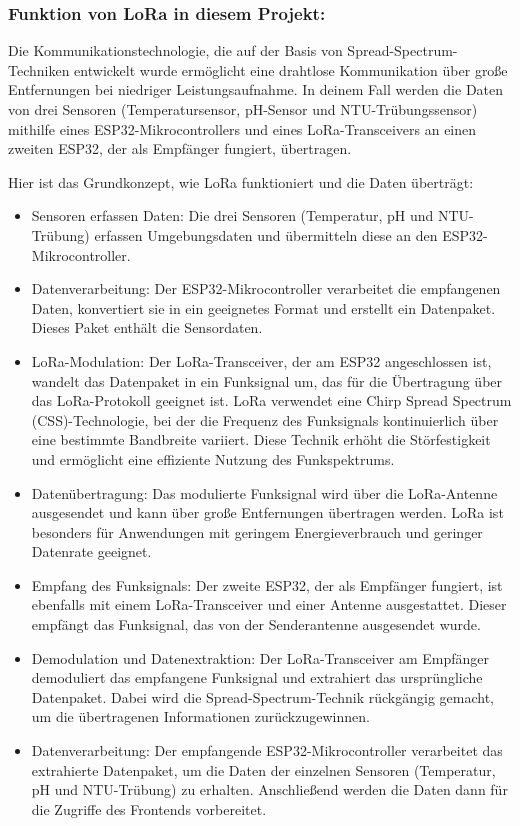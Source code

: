 \subsubsection*{Funktion von LoRa in diesem Projekt:}

Die Kommunikationstechnologie, die auf der Basis von Spread-Spectrum-Techniken entwickelt wurde ermöglicht eine drahtlose 
Kommunikation über große Entfernungen bei niedriger Leistungsaufnahme. 
In deinem Fall werden die Daten von drei Sensoren (Temperatursensor, pH-Sensor und NTU-Trübungssensor) mithilfe eines \newline ESP32-Mikrocontrollers und eines LoRa-Transceivers an einen zweiten ESP32, der als Empfänger fungiert, übertragen.


Hier ist das Grundkonzept, wie LoRa funktioniert und die Daten überträgt:

\begin{itemize}
  \item Sensoren erfassen Daten: Die drei Sensoren (Temperatur, pH und NTU-Trübung) erfassen Umgebungsdaten und übermitteln diese an den ESP32-Mikrocontroller.
  \item Datenverarbeitung: Der ESP32-Mikrocontroller verarbeitet die empfangenen Daten, konvertiert sie in ein geeignetes Format und erstellt ein Datenpaket. Dieses Paket enthält die Sensordaten.
  \item LoRa-Modulation: Der LoRa-Transceiver, der am ESP32 angeschlossen ist, wandelt das Datenpaket in ein Funksignal um, das für die Übertragung über das LoRa-Protokoll geeignet ist. LoRa verwendet eine Chirp Spread Spectrum (CSS)-Technologie, bei der die Frequenz des Funksignals kontinuierlich über eine bestimmte Bandbreite variiert. Diese Technik erhöht die Störfestigkeit und ermöglicht eine effiziente Nutzung des Funkspektrums.
  \item Datenübertragung: Das modulierte Funksignal wird über die LoRa-Antenne ausgesendet und kann über große Entfernungen übertragen werden. LoRa ist besonders für Anwendungen mit geringem Energieverbrauch und geringer Datenrate geeignet.
  \item Empfang des Funksignals: Der zweite ESP32, der als Empfänger fungiert, ist ebenfalls mit einem LoRa-Transceiver und einer Antenne ausgestattet. Dieser empfängt das Funksignal, das von der Senderantenne ausgesendet wurde.
  \item Demodulation und Datenextraktion: Der LoRa-Transceiver am Empfänger demoduliert das empfangene Funksignal und extrahiert das ursprüngliche Datenpaket. Dabei wird die Spread-Spectrum-Technik rückgängig gemacht, um die übertragenen Informationen zurückzugewinnen.
  \item Datenverarbeitung: Der empfangende ESP32-Mikrocontroller verarbeitet das extrahierte Datenpaket, um die Daten der einzelnen Sensoren (Temperatur, pH und NTU-Trübung) zu erhalten. Anschließend werden die Daten dann für die Zugriffe des Frontends vorbereitet.
\end{itemize}

